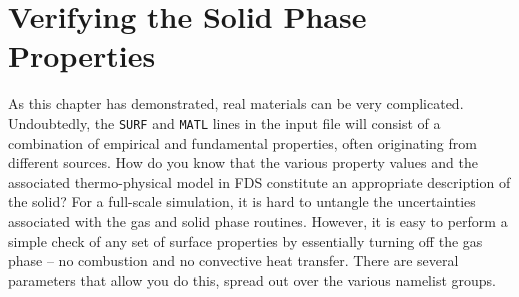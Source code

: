 \documentclass[11pt]{book}
\newcommand{\ct}{\tt\small}
\begin{document}
\clearpage

\section{Verifying the Solid Phase Properties}
\label{solid_phase_verification}

As this chapter has demonstrated, real materials can be very complicated. Undoubtedly, the {\ct SURF} and {\ct MATL} lines in the
input file will consist of a combination of empirical and fundamental properties, often originating from different sources. How do you know
that the various property values and the associated thermo-physical model in FDS
constitute an appropriate description of the solid? For a full-scale simulation, it is hard to untangle the uncertainties associated with the gas and solid
phase routines. However, it is easy to perform a simple check of any set of surface properties by essentially turning off the gas phase -- no combustion and
no convective heat transfer. There are several parameters that allow you do this, spread out over the various namelist groups.
\end{document}
